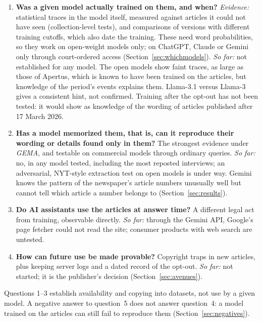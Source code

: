 \documentclass[10pt,a4paper]{article}
\begin{document}
\begin{enumerate}[leftmargin=*,itemsep=3pt]
any other website, although the template asks for the main domains. Google, xAI, Meta and Anthropic name no dataset.
Probable but undocumented: the others (Section~\ref{sec:presence}, Tables~\ref{tab:datasets},~\ref{tab:models}).
\item \textbf{Was a given model actually trained on them, and when?}
\emph{Evidence:} statistical traces in the model itself, measured against articles it could not have seen
(collection-level tests), and comparisons of versions with different training cutoffs, which also date the
training. These need word probabilities, so they work on open-weight models only; on ChatGPT, Claude or Gemini only
through court-ordered access (Section~\ref{sec:whichmodels}).
\emph{So far:} not established for any model. The open models show faint traces, as large as those of Apertus,
which is known to have been trained on the articles, but knowledge of the period's events explains them. Llama-3.1
versus Llama-3 gives a consistent hint, not confirmed. Training after the opt-out has not been tested: it would show
as knowledge of the wording of articles published after 17 March 2026.
\item \textbf{Has a model memorized them, that is, can it reproduce their wording or details found only in them?}
The strongest evidence under \emph{GEMA}, and testable on commercial models through ordinary queries.
\emph{So far:} no, in any model tested, including the most reposted interviews; an adversarial, NYT-style
extraction test on open models is under way. Gemini knows the pattern of the newspaper's article numbers unusually
well but cannot tell which article a number belongs to (Section~\ref{sec:results}).
\item \textbf{Do AI assistants use the articles at answer time?} A different legal act from training, observable
directly. \emph{So far:} through the Gemini API, Google's page fetcher could not read the site; consumer products
with web search are untested.
\item \textbf{How can future use be made provable?} Copyright traps in new articles, plus keeping server logs and a
dated record of the opt-out. \emph{So far:} not started; it is the publisher's decision (Section~\ref{sec:avenues}).
\end{enumerate}
Questions 1--3 establish availability and copying into datasets, not use by a given model. A negative answer to
question~5 does not answer question~4: a model trained on the articles can still fail to reproduce them
(Section~\ref{sec:negatives}).
\end{document}
